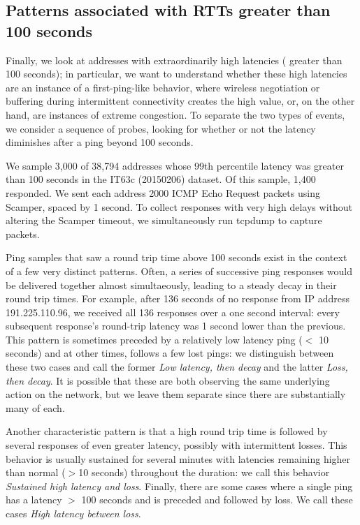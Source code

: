 
\subsection{Patterns associated with RTTs greater than 100 seconds}

Finally, we look at addresses with extraordinarily high
latencies ( greater than 100 seconds); in particular, we want to
understand whether these high latencies are an instance of a
first-ping-like behavior, where wireless negotiation or
buffering during intermittent connectivity creates the high
value, or, on the other hand, are instances of extreme
congestion.  To separate the two types of events, we consider
a sequence of probes, looking for whether or not the latency
diminishes after a ping beyond 100 seconds.

We sample 3,000 of 38,794 addresses whose 99th percentile
latency was greater than 100 seconds in the IT63c (20150206)
dataset.  Of this sample, 1,400 responded.
%
We sent each address 2000 ICMP Echo Request packets using
Scamper, spaced by 1 second.
%
To collect responses with very high delays without altering
the Scamper timeout, we simultaneously run tcpdump to
capture packets.
%

Ping samples that saw a round trip time above 100 seconds
exist in the context of a few very distinct patterns.
%
Often, a series of successive ping responses would be delivered
together almost simultaeously, leading to a steady decay in their
round trip times.
%
For example, after 136 seconds of no response
from IP address 191.225.110.96, we received all 136 responses over
a one second interval: every subsequent response's
round-trip latency was 1 second lower than the previous.
%
This pattern is sometimes preceded by a relatively low latency ping
($<$ 10
seconds) and at other times, follows a few lost pings: we distinguish
between these two cases and call the former \emph{Low latency, then decay}
and the latter \emph{Loss, then decay}.  It is possible that these
are both observing the same underlying action on the network, but
we leave them separate since there are substantially many of each.
%

Another characteristic pattern is that a high round trip time is
followed by
 several responses of even greater latency, possibly with intermittent losses.
%
This behavior is usually sustained for several minutes with latencies
remaining higher than normal ($>$10 seconds) throughout the duration:
we call this behavior \emph{Sustained high latency and loss}.
%
Finally, there are some cases where a single ping has a latency $>$
100 seconds and is preceded and followed by loss. We call these cases
\emph{High latency between loss}.

